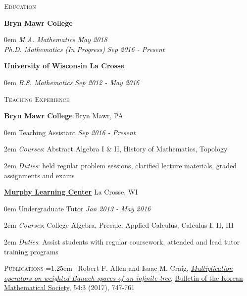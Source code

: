 \documentclass[11pt]{article}
\newenvironment{headitem}[2]{\hspace{.5em} \textbf{#1} \hfill #2 \begin{addmargin}[0em]{0em}}{\end{addmargin}}
\renewenvironment{section}[1]{\textsc{\large #1} \vskip5pt}{\vskip10pt}
\newcommand{\itemreg}[1]{\begin{addmargin}[.75em]{2em} #1 \end{addmargin}}
\newcommand{\itemdate}[2]{\hspace{.5em} #1 \hfill \textit{#2} \\}
\newcommand{\itemitdate}[2]{\hspace{.5em} \textit{#1} \hfill \textit{#2} \\}
\newcommand{\itembul}[1]{\hangindent=1.25em \hspace{.4em} \textbullet \ #1 \\}
\begin{document}
\null
\vskip20pt



\begin{section}{Education}

	\begin{headitem}{Bryn Mawr College}{}
		\itemitdate{M.A. Mathematics}{May 2018}
		\itemitdate{Ph.D. Mathematics (In Progress)}{Sep 2016 - Present}
	\end{headitem}
	\vskip5pt
	
	\begin{headitem}{University of Wisconsin La Crosse}{}
		\itemitdate{B.S. Mathematics}{Sep 2012 - May 2016}
	\end{headitem}
	
\end{section}



\begin{section}{Teaching Experience}
	
	\begin{headitem}{Bryn Mawr College}{Bryn Mawr, PA}
		\itemdate{Teaching Assistant}{Sep 2016 - Present}
		\itemreg{\textit{Courses}: Abstract Algebra I \& II, History of Mathematics, Topology}
		\itemreg{\textit{Duties}: held regular problem sessions, clarified lecture materials, graded assignments and exams}
	\end{headitem}
	\vskip5pt
	
	\begin{headitem}{\href{https://www.uwlax.edu/murphy-learning-center/}{Murphy Learning Center}}{La Crosse, WI}
		\itemdate{Undergraduate Tutor}{Jan 2013 - May 2016}
		\itemreg{\textit{Courses}: College Algebra, Precalc, Applied Calculus, Calculus I, II, III}
		\itemreg{\textit{Duties}: Assist students with regular coursework, attended and lead tutor training programs}
	\end{headitem}

\end{section}



\begin{section}{Publications}
	\itembul{Robert F. Allen and Isaac M. Craig, \textit{\href{{http://bkms.kms.or.kr/journal/view.html?multi\%5B\%5D=7656\&tops=\&book=BKMS\&start=0\&scale=50\&authkey=\&keykey=\&key_1=\&titlekey=\&tit_1=\&abskey=\&abs_1=\&msckey=\&msc_1=\&Vol=54\&Num=3\&PG=\&year1=\&year2=\&sort=Regnum-0\&aut_box=Y\&sub_box=Y\&sos_box=\&key_box=\&pub_box=Y\&abs_box=\&mod=vol\&sflag=\&language=\&uid=}}{Multiplication operators on weighted Banach spaces of an infinite tree}}, \href{http://bkms.kms.or.kr/}{Bulletin of the Korean Mathematical Society}, 54:3 (2017), 747-761}
\end{section}
\end{document}
